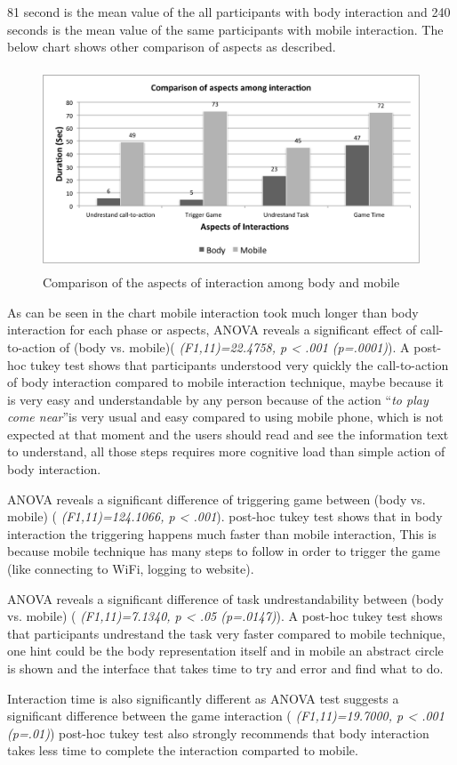 \begin{itemize}
81 second is the mean value of the all participants with body interaction and 240 seconds is the mean value of the same participants with mobile interaction. The below chart shows other comparison of aspects as described.

\begin{figure}[H]
\centering
\includegraphics[width=12cm,height=6cm]{Figures/6/mobile_body_aspect}%
 \caption{Comparison of the aspects of interaction among body and mobile }%
 \label{fig:mobile_body_aspect}%
\end{figure}


As can be seen in the chart mobile interaction took much longer than body interaction for each phase or aspects, ANOVA reveals a significant effect of call-to-action of (body vs. mobile)( \emph{(F1,11)=22.4758, p < .001 (p=.0001)}). A post-hoc tukey test shows that participants understood very quickly the call-to-action of body interaction compared to mobile interaction technique, maybe because it is very easy and understandable by any person because of the action ``\emph{to play come near}''is very usual and easy compared to using mobile phone, which is not expected at that moment and the users should read and see the information text to understand, all those steps requires more cognitive load than simple action of body interaction.

ANOVA reveals a significant difference of triggering game between (body vs. mobile) ( \emph{(F1,11)=124.1066, p < .001}). post-hoc tukey test shows that in body interaction the triggering happens much faster than mobile interaction, This is because mobile technique has many steps to follow in order to trigger the game (like connecting to WiFi, logging to website).


ANOVA reveals a significant difference of task undrestandability between (body vs. mobile) ( \emph{(F1,11)=7.1340, p < .05 (p=.0147)}). A post-hoc tukey test shows that participants undrestand the task very faster compared to mobile technique, one hint could be the body representation itself and in mobile an abstract circle is shown and the interface that takes time to try and error and find what to do.

Interaction time is also significantly different as ANOVA test suggests a significant difference between the game interaction ( \emph{(F1,11)=19.7000, p < .001 (p=.01)}) post-hoc tukey test also strongly recommends that body interaction takes less time to complete the interaction comparted to mobile.



\end{itemize}



